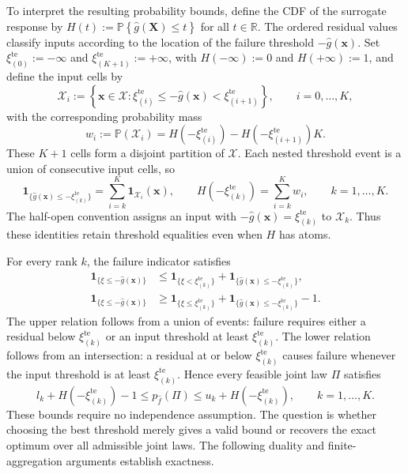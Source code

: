 \documentclass[review,11pt,3p,authoryear,nopreprintline]{elsarticle}
\begin{document}
To interpret the resulting probability bounds, define the CDF of the surrogate response by $H(t):=\mathbb P\left\{\hat g(\bm X)\le t\right\}$ for all $t\in\mathbb R$. The ordered residual values classify inputs according to the location of the failure threshold $-\hat g(\bm x)$. Set $\xi_{(0)}^{\mathrm{te}}:=-\infty$ and $\xi_{(K+1)}^{\mathrm{te}}:=+\infty$, with $H(-\infty):=0$ and $H(+\infty):=1$, and define the input cells by 
\begin{equation}
  \mathcal X_i :=\left\{\bm x\in\mathcal X: \xi_{(i)}^{\mathrm{te}}\le-\hat g(\bm x)<\xi_{(i+1)}^{\mathrm{te}}\right\}, \qquad i=0,\ldots,K,
\end{equation}
with the corresponding probability mass
\begin{equation}
  w_i :=\mathbb P(\mathcal X_i) =H\left(-\xi_{(i)}^{\mathrm{te}}\right)-H\left(-\xi_{(i+1)}^{\mathrm{te}}\right)K. 
\end{equation} 
These $K+1$ cells form a disjoint partition of $\mathcal X$. Each nested threshold event is a union of consecutive input cells, so
\begin{equation}
  \mathbf1_{\{\hat g(\bm x)\le-\xi_{(k)}^{\mathrm{te}}\}}
    =\sum_{i=k}^K\mathbf1_{\mathcal X_i}(\bm x),
  \qquad
  H\left(-\xi_{(k)}^{\mathrm{te}}\right)=\sum_{i=k}^K w_i,
  \qquad k=1,\ldots,K.
  \label{eq-input-threshold-masses}
\end{equation}
The half-open convention assigns an input with $-\hat g(\bm x)=\xi_{(k)}^{\mathrm{te}}$ to $\mathcal X_k$. Thus these identities retain threshold equalities even when $H$ has atoms.

For every rank $k$, the failure indicator satisfies 
\begin{align}
  \mathbf1_{\{\xi\le -\hat g(\bm x)\}}
  &\le
  \mathbf1_{\{\xi<\xi_{(k)}^{\mathrm{te}}\}}+\mathbf1_{\{\hat g(\bm x)\le-\xi_{(k)}^{\mathrm{te}}\}},
  \label{eq-upper-threshold-certificate}\\
  \mathbf1_{\{\xi\le -\hat g(\bm x)\}}
  &\ge
  \mathbf1_{\{\xi\le \xi_{(k)}^{\mathrm{te}}\}}+\mathbf1_{\{\hat g(\bm x)\le-\xi_{(k)}^{\mathrm{te}}\}}-1.
  \label{eq-lower-threshold-certificate}
\end{align}
The upper relation follows from a union of events: failure requires either a residual below $\xi_{(k)}^{\mathrm{te}}$ or an input threshold at least $\xi_{(k)}^{\mathrm{te}}$. The lower relation follows from an intersection: a residual at or below $\xi_{(k)}^{\mathrm{te}}$ causes failure whenever the input threshold is at least $\xi_{(k)}^{\mathrm{te}}$. Hence every feasible joint law $\Pi$ satisfies
\begin{equation}
  l_k+H\left(-\xi_{(k)}^{\mathrm{te}}\right)-1\le p_{\hat f}(\Pi)\le u_k+H\left(-\xi_{(k)}^{\mathrm{te}}\right),
  \qquad k=1,\ldots,K.
  \label{eq-rankwise-failure-bounds}
\end{equation}
These bounds require no independence assumption. The question is whether choosing the best threshold merely gives a valid bound or recovers the exact optimum over all admissible joint laws. The following duality and finite-aggregation arguments establish exactness.
\end{document}
